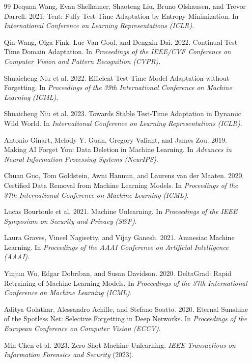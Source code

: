 \documentclass[10pt,twocolumn]{article}
\begin{document}
\begin{thebibliography}{99}
Dequan Wang, Evan Shelhamer, Shaoteng Liu, Bruno Olshausen, and Trevor Darrell. 2021. Tent: Fully Test-Time Adaptation by Entropy Minimization. In \emph{International Conference on Learning Representations (ICLR)}.

Qin Wang, Olga Fink, Luc Van Gool, and Dengxin Dai. 2022. Continual Test-Time Domain Adaptation. In \emph{Proceedings of the IEEE/CVF Conference on Computer Vision and Pattern Recognition (CVPR)}.

Shuaicheng Niu et al. 2022. Efficient Test-Time Model Adaptation without Forgetting. In \emph{Proceedings of the 39th International Conference on Machine Learning (ICML)}.

Shuaicheng Niu et al. 2023. Towards Stable Test-Time Adaptation in Dynamic Wild World. In \emph{International Conference on Learning Representations (ICLR)}.

Antonio Ginart, Melody Y. Guan, Gregory Valiant, and James Zou. 2019. Making AI Forget You: Data Deletion in Machine Learning. In \emph{Advances in Neural Information Processing Systems (NeurIPS)}.

Chuan Guo, Tom Goldstein, Awni Hannun, and Laurens van der Maaten. 2020. Certified Data Removal from Machine Learning Models. In \emph{Proceedings of the 37th International Conference on Machine Learning (ICML)}.

Lucas Bourtoule et al. 2021. Machine Unlearning. In \emph{Proceedings of the IEEE Symposium on Security and Privacy (S\&P)}.

Laura Graves, Vineel Nagisetty, and Vijay Ganesh. 2021. Amnesiac Machine Learning. In \emph{Proceedings of the AAAI Conference on Artificial Intelligence (AAAI)}.

Yinjun Wu, Edgar Dobriban, and Susan Davidson. 2020. DeltaGrad: Rapid Retraining of Machine Learning Models. In \emph{Proceedings of the 37th International Conference on Machine Learning (ICML)}.

Aditya Golatkar, Alessandro Achille, and Stefano Soatto. 2020. Eternal Sunshine of the Spotless Net: Selective Forgetting in Deep Networks. In \emph{Proceedings of the European Conference on Computer Vision (ECCV)}.

Min Chen et al. 2023. Zero-Shot Machine Unlearning. \emph{IEEE Transactions on Information Forensics and Security} (2023).


\end{thebibliography}
\end{document}
